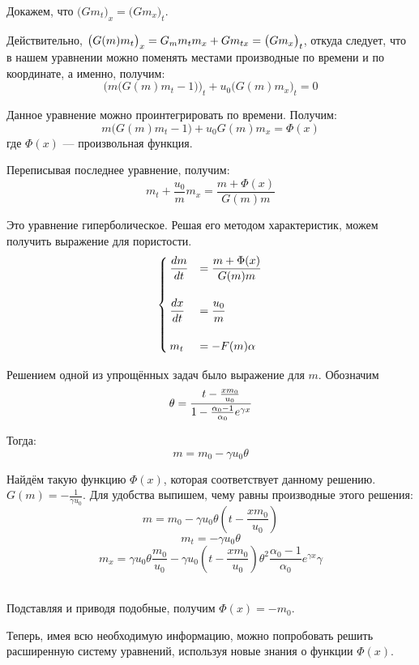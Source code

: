 \par Докажем, что $\big(G m_{t}\big)_{x} = \big(G m_{x}\big)_{t}$.\\
\par Действительно, $\displaystyle \big(G(m)m_{t}\big)_{x} = G_{m}m_{t}m_{x} + G m_{tx} = \big(G m_{x}\big)_{t}$, откуда следует, что в нашем уравнении можно поменять местами производные по времени и по координате, а именно, получим:
$$\Big(m \big(G(m)m_{t} - 1\big)\Big)_{t} + u_{0}\big(G(m)m_{x}\big)_{t} = 0$$
\par Данное уравнение можно проинтегрировать по времени. Получим:\\
$$m \big(G(m)m_{t} - 1\big) + u_{0}G(m)m_{x} = \Phi(x)$$
где $\Phi(x)$ --- произвольная функция.
\par Переписывая последнее уравнение, получим:
$$m_{t}+\frac{u_{0}}{m}m_{x}=\frac{m+\Phi(x)}{G(m)m}$$
\par Это уравнение гиперболическое. Решая его методом характеристик, можем получить выражение для пористости.\\
\begin{equation*}
\begin{cases}

\displaystyle \frac{dm}{dt} &= \displaystyle \frac{m+\Phi(x)}{G(m)m}\\
&\\
\displaystyle \frac{dx}{dt}&= \displaystyle \frac{u_{0}}{m}\\
&\\
m_{t} &= -F(m)\alpha\\

\end{cases}
\end{equation*}

\par Решением одной из упрощённых задач было выражение для $m$. Обозначим
$$\displaystyle \theta=\frac{t-\frac{xm_{0}}{u_{0}}}{1 - \frac{\alpha_{0}-1}{\alpha_{0}}e^{\gamma x}}$$
\par Тогда:\\
$$m=m_{0}-\gamma u_{0}\theta$$
\par Найдём такую функцию $\Phi(x)$, которая соответствует данному решению. $G(m)=-\frac{1}{\gamma u_{0}}$. Для удобства выпишем, чему равны производные этого решения:\\
$$m = m_{0} - \gamma u_{0}\theta(t-\frac{xm_{0}}{u_{0}})$$
$$m_{t} = -\gamma u_{0}\theta$$
$$m_{x} = \gamma u_{0}\theta\frac{m_{0}}{u_{0}}-\gamma u_{0}(t-\frac{xm_{0}}{u_{0}})\theta^{2}\frac{\alpha_{0}-1}{\alpha_{0}}e^{\gamma x}\gamma$$\\
\par Подставляя и приводя подобные, получим $\Phi(x)=-m_{0}$.
\par Теперь, имея всю необходимую информацию, можно попробовать решить расширенную систему уравнений, используя новые знания о функции $\Phi(x)$.

